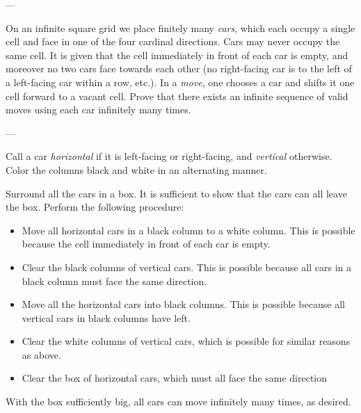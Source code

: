 
---

On an infinite square grid we place finitely many \emph{cars}, which each occupy a single cell and face in one of the four cardinal directions. Cars may never occupy the same cell. It is given that the cell immediately in front of  each car is empty, and moreover no two cars face towards each other (no right-facing car is to the left of a left-facing car within a row, etc.). In a \emph{move}, one chooses a car and shifts it one cell forward to a vacant cell. Prove that there exists an infinite sequence of valid moves using each car infinitely many times.

---

Call a car \emph{horizontal} if it is left-facing or right-facing, and \emph{vertical} otherwise. Color the columns black and white in an alternating manner.

Surround all the cars in a box. It is sufficient to show that the cars can all leave the box. Perform the following procedure:
\begin{itemize}
    \item Move all horizontal cars in a black column to a white column. This is possible because the cell immediately in front of each car is empty.
    \item Clear the black columns of vertical cars. This is possible because all cars in a black column must face the same direction.
    \item Move all the horizontal cars into black columns. This is possible because all vertical cars in black columns have left.
    \item Clear the white columns of vertical cars, which is possible for similar reasons as above.
    \item Clear the box of horizontal cars, which must all face the same direction
\end{itemize}
With the box sufficiently big, all cars can move infinitely many times, as desired.
